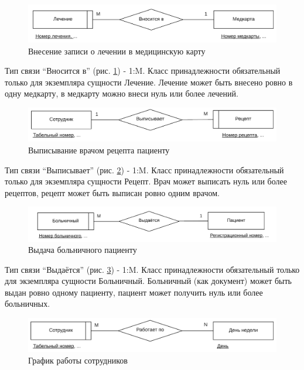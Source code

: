 \documentclass[14pt,a4paper,russian]{extreport}
\begin{document}
\begin{figure}[h!]
        \includegraphics[width=\textwidth]{medcure}
        \caption{Внесение записи о лечении в медицинскую карту}
        \label{fig:medcure}
\end{figure}
Тип связи ``Вносится в'' (рис. \ref{fig:medcure}) - 1:M.
Класс принадлежности обязательный только для экземпляра сущности Лечение.
Лечение может быть внесено ровно в одну медкарту, в медкарту можно
внеси нуль или более лечений.

\begin{figure}[h!]
        \includegraphics[width=\textwidth]{receipt}
        \caption{Выписывание врачом рецепта пациенту}
        \label{fig:receipt}
\end{figure}

Тип связи ``Выписывает'' (рис. \ref{fig:receipt}) - 1:M.
Класс принадлежности обязательный только для экземпляра сущности Рецепт.
Врач может выписать нуль или более рецептов,
рецепт может быть выписан ровно одним врачом.\par

\begin{figure}[h!]
        \includegraphics[width=\textwidth]{empbolpat}
        \caption{Выдача больничного пациенту}
        \label{fig:empbolpat}
\end{figure}

Тип связи ``Выдаётся'' (рис. \ref{fig:empbolpat}) - 1:M.
Класс принадлежности обязательный только для экземпляра сущности Больничный.
Больничный (как документ) может быть выдан ровно одному пациенту,
пациент может получить нуль или более больничных.

\begin{figure}[h!]
        \includegraphics[width=\textwidth]{timetable}
        \caption{График работы сотрудников}
        \label{fig:timetable}
\end{figure}
\end{document}
